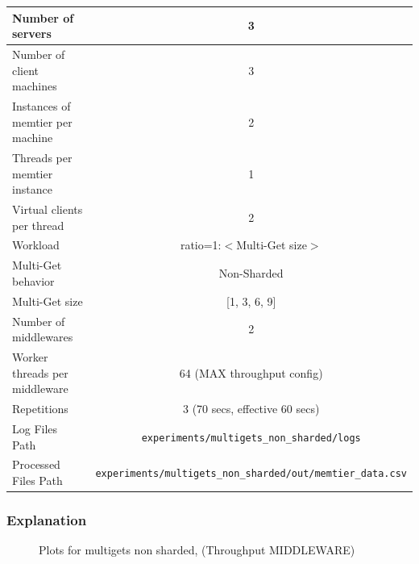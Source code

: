 \documentclass[11pt,a4paper]{article}
\begin{document}
\begin{center}
	\scriptsize{
		\begin{tabular}{|l|c|}
			\hline Number of servers                & 3                       \\ 
			\hline Number of client machines        & 3                       \\ 
			\hline Instances of memtier per machine & 2                       \\ 
			\hline Threads per memtier instance     & 1                       \\
			\hline Virtual clients per thread       & 2                		 \\ 
			\hline Workload                         & ratio=1:$<$Multi-Get size$>$              \\
			\hline Multi-Get behavior               & Non-Sharded             \\
			\hline Multi-Get size                   & [1, 3, 6, 9]                  \\
			\hline Number of middlewares            & 2                       \\
            \hline Worker threads per middleware    & 64 (MAX throughput config) \\
            \hline Repetitions                      & 3 (70 secs, effective 60 secs) \\ 
            \hline Log Files Path                   & \texttt{experiments/multigets\_non\_sharded/logs} \\
            \hline Processed Files Path             & \texttt{experiments/multigets\_non\_sharded/out/memtier\_data.csv}\\
            \hline
		\end{tabular}
	} 
\end{center}

\subsubsection{Explanation}

\begin{figure}[!h]
  \centering
    \caption{Plots for multigets non sharded, (Throughput MIDDLEWARE)}
  \label{fig:multigets_non_sharded_mw_tp}
\end{figure}
\end{document}
